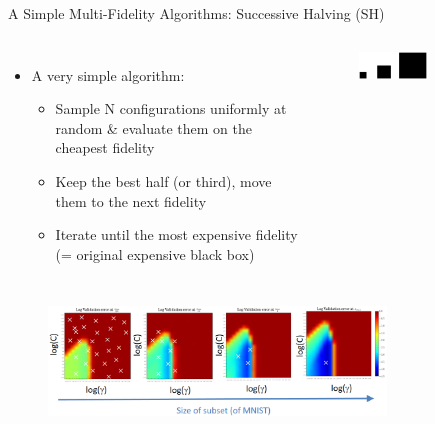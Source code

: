 



\begin{frame}{A Simple Multi-Fidelity Algorithms: Successive Halving (SH)}
\vskip -10pt
\hskip 270pt

\begin{columns}

    \begin{itemize}
        \item A very simple algorithm:
        \begin{itemize}
            \item Sample N configurations uniformly at random \& evaluate them on the cheapest fidelity
            \item Keep the best half (or third), move them to the next fidelity
            \item Iterate until the most expensive fidelity (= original expensive black box)
        \end{itemize}
    \end{itemize}
    
    \begin{figure}
        \centering
        \includegraphics[width=0.6\textwidth]{../w07_hpo_speedup/images/hyperband/black_blocks.png}
    \end{figure}

\end{columns}

\begin{figure}
    \centering
    \includegraphics[width=0.8\textwidth]{../w07_hpo_speedup/images/hyperband/hyperband_fidelities.png}
\end{figure}
    
\end{frame}

